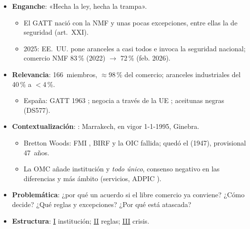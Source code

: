 \documentclass{article}
\begin{document}
\cabecerarepaso
\begin{columnas}

\begin{itemize}
\item \textbf{Enganche}: «Hecha la ley, hecha la trampa».
  \begin{itemize}
  \item El GATT nació con la NMF y unas pocas excepciones, entre ellas la de seguridad (art.~XXI).
  \item 2025: EE.~UU. pone aranceles a casi todos e invoca la seguridad nacional; comercio NMF 83\,\% (2022) $\to$ 72\,\% (feb. 2026).
  \end{itemize}
\item \textbf{Relevancia}: 166~miembros, $\approx$98\,\% del comercio; aranceles industriales del 40\,\% a $<$4\,\%.
  \begin{itemize}
  \item España: GATT 1963 ; negocia a través de la UE ; aceitunas negras (DS577).
  \end{itemize}
\item \textbf{Contextualización}: : Marrakech, en vigor 1-1-1995, Ginebra.
  \begin{itemize}
  \item Bretton Woods: FMI , BIRF  y la OIC fallida; quedó el  (1947), provisional 47~años.
  \item La OMC añade institución y \emph{todo único}, consenso negativo en las diferencias y más ámbito (servicios, ADPIC ).
  \end{itemize}
\item \textbf{Problemática}: ¿por qué un acuerdo si el libre comercio ya conviene? ¿Cómo decide? ¿Qué reglas y excepciones? ¿Por qué está atascada?
\item \textbf{Estructura}: \hyperref[rep:I]{I} institución; \hyperref[rep:II]{II} reglas; \hyperref[rep:III]{III} crisis.
\end{itemize}


\end{columnas}
\end{document}
